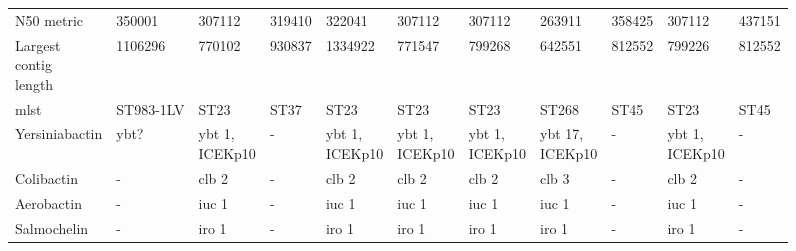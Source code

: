 \begin{sidewaystable}[ht]
\begin{threeparttable}
\begin{tabularx}{\textwidth}{lllllllllll}
                    N50 metric &                 350001 &                           307112 &            319410 &                   322041 &                          307112 &                         307112 &                           263911 &                  358425 &                           307112 &                  437151 \\
 \mCL{Largest\\contig\\length} &                1106296 &                           770102 &            930837 &                  1334922 &                          771547 &                         799268 &                           642551 &                  812552 &                           799226 &                  812552 \\
                    \gls{mlst} &              ST983-1LV &                             ST23 &              ST37 &                     ST23 &                            ST23 &                           ST23 &                            ST268 &                    ST45 &                             ST23 &                    ST45 \\
\midrule
                Yersiniabactin &                   ybt? &            \mCL{ybt 1,\\ICEKp10} &                 - &    \mCL{ybt 1,\\ICEKp10} &           \mCL{ybt 1,\\ICEKp10} &          \mCL{ybt 1,\\ICEKp10} &           \mCL{ybt 17,\\ICEKp10} &                       - &            \mCL{ybt 1,\\ICEKp10} &                       - \\
                    Colibactin &                      - &                            clb 2 &                 - &                    clb 2 &                           clb 2 &                          clb 2 &                            clb 3 &                       - &                            clb 2 &                       - \\
                    Aerobactin &                      - &                            iuc 1 &                 - &                    iuc 1 &                           iuc 1 &                          iuc 1 &                            iuc 1 &                       - &                            iuc 1 &                       - \\
                   Salmochelin &                      - &                            iro 1 &                 - &                    iro 1 &                           iro 1 &                          iro 1 &                            iro 1 &                       - &                            iro 1 &                       - \\

\end{tabularx}
\end{threeparttable}
\end{sidewaystable}
